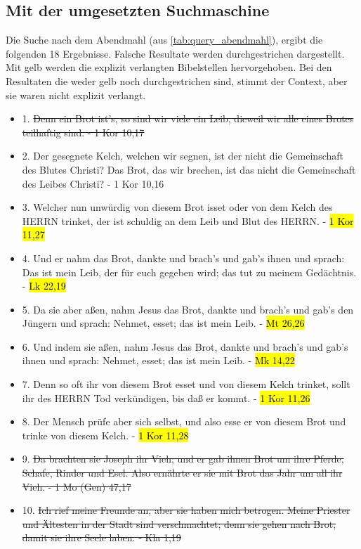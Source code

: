 \subsection{Mit der umgesetzten Suchmaschine}
Die Suche nach dem Abendmahl (aus \cref{tab:query_abendmahl}), ergibt die folgenden 18 Ergebnisse.
Falsche Resultate werden durchgestrichen dargestellt. Mit gelb werden die explizit verlangten Bibelstellen hervorgehoben.
Bei den Resultaten die weder gelb noch durchgestrichen sind, stimmt der Context, aber sie waren nicht explizit verlangt.\\
\begin{itemize}[noitemsep]
	\item 1.	\st{Denn ein Brot ist's, so sind wir viele ein Leib, dieweil wir alle eines Brotes teilhaftig sind. - 1 Kor 10,17}
	\item 2.	Der gesegnete Kelch, welchen wir segnen, ist der nicht die Gemeinschaft des Blutes Christi? Das Brot, das wir brechen, ist das nicht die Gemeinschaft des Leibes Christi? - 1 Kor 10,16
	\item 3.	Welcher nun unwürdig von diesem Brot isset oder von dem Kelch des HERRN trinket, der ist schuldig an dem Leib und Blut des HERRN. - \hl{1 Kor 11,27}
	\item 4.	Und er nahm das Brot, dankte und brach's und gab's ihnen und sprach: Das ist mein Leib, der für euch gegeben wird; das tut zu meinem Gedächtnis. - \hl{Lk 22,19}
	\item 5.	Da sie aber aßen, nahm Jesus das Brot, dankte und brach's und gab's den Jüngern und sprach: Nehmet, esset; das ist mein Leib. - \hl{Mt 26,26}
	\item 6.	Und indem sie aßen, nahm Jesus das Brot, dankte und brach's und gab's ihnen und sprach: Nehmet, esset; das ist mein Leib. - \hl{Mk 14,22}
	\item 7.	Denn so oft ihr von diesem Brot esset und von diesem Kelch trinket, sollt ihr des HERRN Tod verkündigen, bis daß er kommt. - \hl{1 Kor 11,26}
	\item 8.	Der Mensch prüfe aber sich selbst, und also esse er von diesem Brot und trinke von diesem Kelch. - \hl{1 Kor 11,28}
	\item 9.	\st{Da brachten sie Joseph ihr Vieh; und er gab ihnen Brot um ihre Pferde, Schafe, Rinder und Esel. Also ernährte er sie mit Brot das Jahr um all ihr Vieh. - 1 Mo (Gen) 47,17}
	\item 10.	\st{Ich rief meine Freunde an, aber sie haben mich betrogen. Meine Priester und Ältesten in der Stadt sind verschmachtet; denn sie gehen nach Brot, damit sie ihre Seele laben. - Kla 1,19}

\end{itemize}
